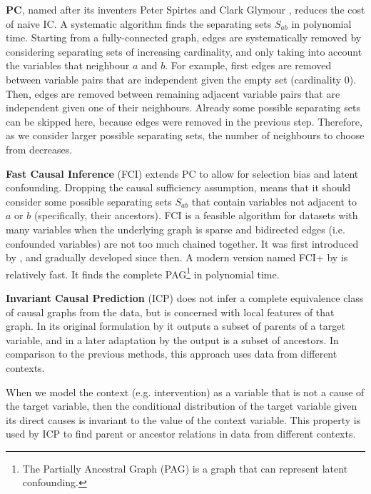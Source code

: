 \textbf{PC}, named after its inventers Peter Spirtes and Clark Glymour \citep{spirtes1991algorithm}, reduces the cost of naive IC. A systematic algorithm finds the separating sets $S_{ab}$ in polynomial time. Starting from a fully-connected graph, edges are systematically removed by considering separating sets of increasing cardinality, and only taking into account the variables that neighbour $a$ and $b$. For example, first edges are removed between variable pairs that are independent given the empty set (cardinality 0). Then, edges are removed between remaining adjacent variable pairs that are independent given one of their neighbours. Already some possible separating sets can be skipped here, because edges were removed in the previous step. Therefore, as we consider larger possible separating sets, the number of neighbours to choose from decreases.

\textbf{Fast Causal Inference} (FCI) extends PC to allow for selection bias and latent confounding. Dropping the causal sufficiency assumption, means that it should consider some possible separating sets $S_{ab}$ that contain variables not adjacent to $a$ or $b$ (specifically, their ancestors). FCI is a feasible algorithm for datasets with many variables when the underlying graph is sparse and bidirected edges (i.e. confounded variables) are not too much chained together. It was first introduced by \citet{spirtes1999algorithm}, and gradually developed since then. A modern version named FCI+ by \citet{claassen2013learning} is relatively fast. It finds the complete PAG\footnote{The Partially Ancestral Graph (PAG) is a graph that can represent latent confounding.} in polynomial time.
            
\textbf{Invariant Causal Prediction} (ICP) does not infer a complete equivalence class of causal graphs from the data, but is concerned with local features of that graph. In its original formulation by \citet{peters2016causal} it outputs a subset of parents of a target variable, and in a later adaptation by \citet{mooij2016joint} the output is a subset of ancestors. In comparison to the previous methods, this approach uses data from different contexts.

When we model the context (e.g. intervention) as a variable that is not a cause of the target variable, then the conditional distribution of the target variable given its direct causes is invariant to the value of the context variable. This property is used by ICP to find parent or ancestor relations in data from different contexts. 

